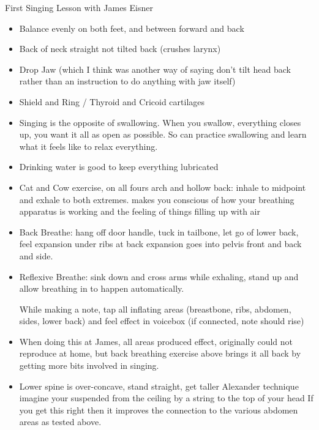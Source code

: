 \documentclass[14pt,a4paper]{memoir}
\begin{document}
First Singing Lesson with James Eisner

\begin{itemize}
\item Balance evenly on both feet, and between forward and back

\item Back of neck straight not tilted back (crushes larynx)

\item Drop Jaw (which I think was another way of saying don't tilt head back rather than an instruction to do anything with jaw itself)

\item Shield and Ring / Thyroid and Cricoid cartilages

\item Singing is the opposite of swallowing. When you swallow, everything closes up, you want it all as open as possible.
So can practice swallowing and learn what it feels like to relax everything.

\item Drinking water is good to keep everything lubricated

\item Cat and Cow exercise, on all fours arch and hollow back: inhale to midpoint and exhale to both extremes.
makes you conscious of how your breathing apparatus is working and the feeling of things filling up with air

\item Back Breathe: hang off door handle, tuck in tailbone, let go of lower back, feel expansion under ribs at back
expansion goes into pelvis front and back and side. 

\item Reflexive Breathe: sink down and cross arms while exhaling, stand up and allow breathing in to happen automatically.

While making a note, tap all inflating areas (breastbone, ribs, abdomen, sides, lower back) and feel effect in voicebox (if connected, note should rise)
\item When doing this at James, all areas produced effect, originally could not reproduce at home, but back breathing exercise above brings it all back by getting more bits involved in singing.

\item Lower spine is over-concave, stand straight, get taller
Alexander technique imagine your suspended from the ceiling by a string to the top of your head
If you get this right then it improves the connection to the various abdomen areas as tested above.


\end{itemize}
\end{document}
